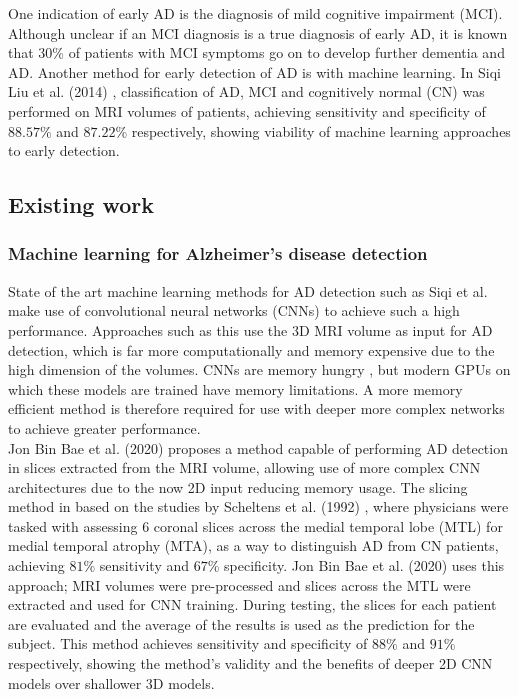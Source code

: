 \documentclass[
    author={Kai Hulme},
    supervisor={Dr Jon Bird},
    degree={BSc},
    title={Generative Adversarial Networks as an Augmentation Technique},
    subtitle={for Alzheimer's Disease Detection in MRI Volumes},
    type={Research},
    year={2021} 
]{dissertation}
\begin{document}
One indication of early AD is the diagnosis of mild cognitive impairment (MCI). Although unclear if an MCI diagnosis is a true diagnosis of early AD, it is known that 30\% of patients with MCI symptoms go on to develop further dementia and AD. Another method for early detection of AD is with machine learning. In Siqi Liu et al. (2014) \cite{liu2014early}, classification of AD, MCI and cognitively normal (CN) was performed on MRI volumes of patients, achieving sensitivity and specificity of $88.57\%$ and $87.22\%$ respectively, showing viability of machine learning approaches to early detection. 


\subsection{Existing work}

\subsubsection{Machine learning for Alzheimer's disease detection}

State of the art machine learning methods for AD detection such as Siqi et al. \cite{liu2014early} make use of convolutional neural networks (CNNs) to achieve such  a high performance. Approaches such as this use the 3D MRI volume as input for AD detection, which is far more computationally and memory expensive due to the high dimension of the volumes. CNNs are memory hungry \cite{wang2018towards}, but modern GPUs on which these models are trained have memory limitations. A more memory efficient method is therefore required for use with deeper more complex networks to achieve greater performance.
\\

Jon Bin Bae et al. (2020) \cite{bae2020identification} proposes a method capable of performing AD detection in slices extracted from the MRI volume, allowing use of more complex CNN architectures due to the now 2D input reducing memory usage. The slicing method in based on the studies by Scheltens et al. (1992) \cite{scheltens1992atrophy}, where physicians were tasked with assessing 6 coronal slices across the medial temporal lobe (MTL) for medial temporal atrophy (MTA), as a way to distinguish AD from CN patients, achieving $81\%$ sensitivity and $67\%$ specificity. Jon Bin Bae et al. (2020) uses this approach; MRI volumes were pre-processed and slices across the MTL were extracted and used for CNN training. During testing, the slices for each patient are evaluated and the average of the results is used as the prediction for the subject. This method achieves sensitivity and specificity of $88\%$ and $91\%$ respectively, showing the method's validity and the benefits of deeper 2D CNN models over shallower 3D models.
\end{document}
